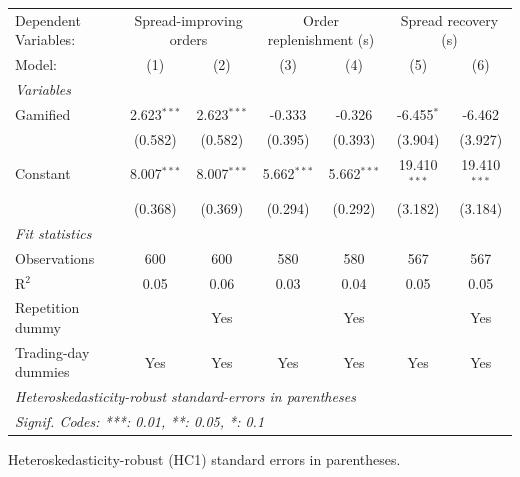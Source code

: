 \begingroup
\centering
\begin{tabular}{lcccccc}
   \tabularnewline \midrule \midrule
   Dependent Variables: & \multicolumn{2}{c}{Spread-improving orders} & \multicolumn{2}{c}{Order replenishment (s)} & \multicolumn{2}{c}{Spread recovery (s)}\\
   Model:              & (1)           & (2)           & (3)           & (4)           & (5)            & (6)\\  
   \midrule
   \emph{Variables}\\
   Gamified            & 2.623$^{***}$ & 2.623$^{***}$ & -0.333        & -0.326        & -6.455$^{*}$   & -6.462\\   
                       & (0.582)       & (0.582)       & (0.395)       & (0.393)       & (3.904)        & (3.927)\\   
   Constant            & 8.007$^{***}$ & 8.007$^{***}$ & 5.662$^{***}$ & 5.662$^{***}$ & 19.410$^{***}$ & 19.410$^{***}$\\   
                       & (0.368)       & (0.369)       & (0.294)       & (0.292)       & (3.182)        & (3.184)\\   
   \midrule
   \emph{Fit statistics}\\
   Observations        & 600           & 600           & 580           & 580           & 567            & 567\\  
   R$^2$               & 0.05          & 0.06          & 0.03          & 0.04          & 0.05           & 0.05\\  
   Repetition dummy    &               & Yes           &               & Yes           &                & Yes\\  
   Trading-day dummies & Yes           & Yes           & Yes           & Yes           & Yes            & Yes\\  
   \midrule \midrule
   \multicolumn{7}{l}{\emph{Heteroskedasticity-robust standard-errors in parentheses}}\\
   \multicolumn{7}{l}{\emph{Signif. Codes: ***: 0.01, **: 0.05, *: 0.1}}\\
\end{tabular}
 
\par \raggedright 
Heteroskedasticity-robust (HC1) standard errors in parentheses.
\par\endgroup
